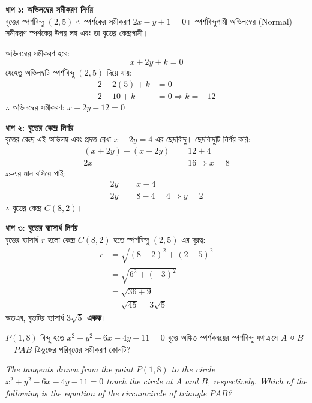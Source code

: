 \documentclass[12pt, a4paper]{article}
\begin{document}
\begin{tcolorbox}[solutionbox={সমাধান (Solution)}]
    \noindent
    \textbf{ধাপ ১: অভিলম্বের সমীকরণ নির্ণয়} \\
    বৃত্তের স্পর্শবিন্দু $(2, 5)$ এ স্পর্শকের সমীকরণ $2x - y + 1 = 0$। স্পর্শবিন্দুগামী অভিলম্বের (Normal) সমীকরণ স্পর্শকের উপর লম্ব এবং তা বৃত্তের কেন্দ্রগামী। 
    
    অভিলম্বের সমীকরণ হবে: 
    \[ x + 2y + k = 0 \]
    যেহেতু অভিলম্বটি স্পর্শবিন্দু $(2, 5)$ দিয়ে যায়: 
    \begin{align*}
        2 + 2(5) + k &= 0 \\
        2 + 10 + k &= 0 \Rightarrow k = -12
    \end{align*}
    $\therefore$ অভিলম্বের সমীকরণ: $x + 2y - 12 = 0$
    
    \vspace{0.5em}
    \noindent\textbf{ধাপ ২: বৃত্তের কেন্দ্র নির্ণয়} \\
    বৃত্তের কেন্দ্র এই অভিলম্ব এবং প্রদত্ত রেখা $x - 2y = 4$ এর ছেদবিন্দু। ছেদবিন্দুটি নির্ণয় করি:
    \begin{align*}
        (x + 2y) + (x - 2y) &= 12 + 4 \\
        2x &= 16 \Rightarrow x = 8
    \end{align*}
    $x$-এর মান বসিয়ে পাই:
    \begin{align*}
        2y &= x - 4 \\
        2y &= 8 - 4 = 4 \Rightarrow y = 2
    \end{align*}
    $\therefore$ বৃত্তের কেন্দ্র $C(8, 2)$। 
    
    \vspace{0.5em}
    \noindent\textbf{ধাপ ৩: বৃত্তের ব্যাসার্ধ নির্ণয়} \\
    বৃত্তের ব্যাসার্ধ $r$ হলো কেন্দ্র $C(8, 2)$ হতে স্পর্শবিন্দু $(2, 5)$ এর দূরত্ব:
    \begin{align*}
        r &= \sqrt{(8 - 2)^2 + (2 - 5)^2} \\
          &= \sqrt{6^2 + (-3)^2} \\
          &= \sqrt{36 + 9} \\
          &= \sqrt{45} = 3\sqrt{5}
    \end{align*}
    অতএব, বৃত্তটির ব্যাসার্ধ \textbf{$3\sqrt{5}$ একক}।
\end{tcolorbox}


\begin{tcolorbox}[questionbox={প্রশ্ন (Question) 4}]
    \noindent
    $P(1, 8)$ বিন্দু হতে $x^2 + y^2 - 6x - 4y - 11 = 0$ বৃত্তে অঙ্কিত স্পর্শকদ্বয়ের স্পর্শবিন্দু যথাক্রমে $A$ ও $B$। $PAB$ ত্রিভুজের পরিবৃত্তের সমীকরণ কোনটি?
    
    \vspace{0.8em}
    \begin{english}
    \noindent\textit{\color{darkgray}
    The tangents drawn from the point $P(1, 8)$ to the circle $x^2 + y^2 - 6x - 4y - 11 = 0$ touch the circle at $A$ and $B$, respectively. Which of the following is the equation of the circumcircle of triangle $PAB$?
    }
    \end{english}
\end{tcolorbox}
\end{document}
